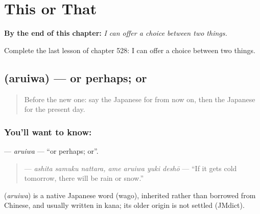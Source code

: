 
\chapter{This or That}
\label{ch:ja-this-or-that}

\begin{chapteropening}
\textbf{By the end of this chapter:} \emph{I can offer a choice between two things.}

Complete the last lesson of chapter 528: I can offer a choice between two things.
\end{chapteropening}

\section[\texorpdfstring{\ja{あるいは} (aruiwa)}{あるいは (aruiwa)}]{ (aruiwa) — or perhaps; or}

\label{lesson:JA-C528-aruiwa}



\begin{quote}
Before the new one: say the Japanese for from now on, then the Japanese for the present day.
\end{quote}

\subsection*{You'll want to know: }
\textbf{} — \emph{aruiwa} — \textquotedblleft{}or perhaps; or\textquotedblright{}.

\begin{quote}
\textbf{    } — \emph{ashita samuku nattara, ame aruiwa yuki deshō} — \textquotedblleft{}If it gets cold tomorrow, there will be rain or snow.\textquotedblright{}
\end{quote}

\begin{cousinweb}
\textbf{} (\emph{aruiwa}) is a native Japanese word (wago), inherited rather than borrowed from Chinese, and usually written in kana; its older origin is not settled (JMdict).
\end{cousinweb}

